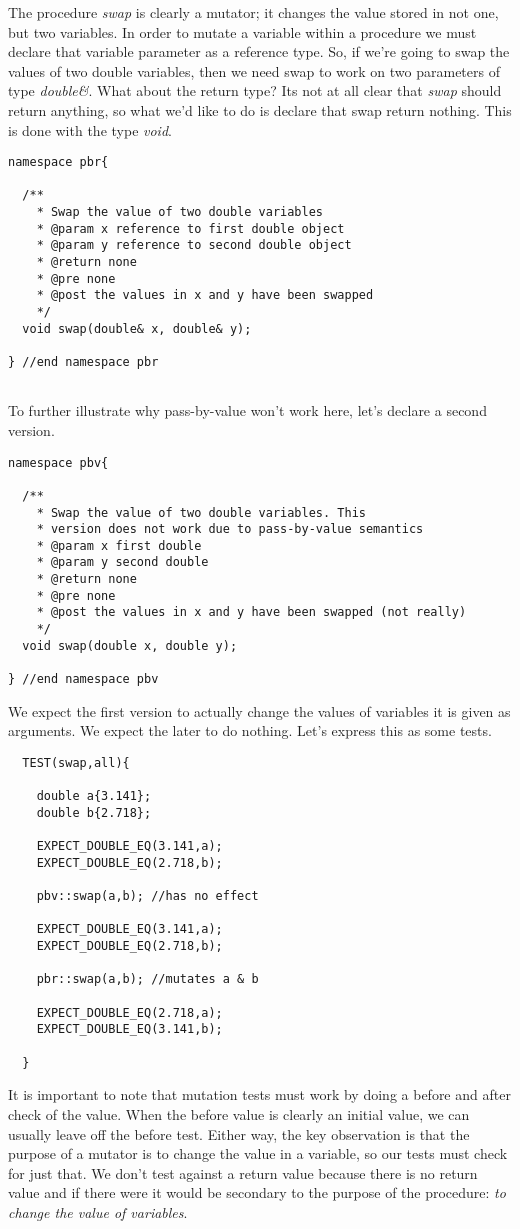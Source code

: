\documentclass[nobib]{tufte-handout}
\begin{document}
The procedure \textit{swap} is clearly a mutator; it changes the value stored in not one, but two variables. In order to mutate a variable within a procedure we must declare that variable parameter as a reference type. So, if we're going to swap the values of two double variables, then we need swap to work on two parameters of type \textit{double\&}. What about the return type? Its not at all clear that \textit{swap} should return anything, so what we'd like to do is declare that swap return nothing. This is done with the type \textit{void}.
\begin{verbatim}
namespace pbr{

  /**
    * Swap the value of two double variables
    * @param x reference to first double object
    * @param y reference to second double object 
    * @return none
    * @pre none
    * @post the values in x and y have been swapped
    */
  void swap(double& x, double& y);

} //end namespace pbr


\end{verbatim}
To further illustrate why pass-by-value won't work here, let's declare a second version.
\begin{verbatim}
namespace pbv{

  /**
    * Swap the value of two double variables. This
    * version does not work due to pass-by-value semantics
    * @param x first double
    * @param y second double
    * @return none
    * @pre none
    * @post the values in x and y have been swapped (not really)
    */
  void swap(double x, double y);

} //end namespace pbv
\end{verbatim}

We expect the first version to actually change the values of variables it is given as arguments. We expect the later to do nothing. Let's express this as some tests.
\begin{verbatim}
  TEST(swap,all){

    double a{3.141};
    double b{2.718};

    EXPECT_DOUBLE_EQ(3.141,a);
    EXPECT_DOUBLE_EQ(2.718,b);

    pbv::swap(a,b); //has no effect

    EXPECT_DOUBLE_EQ(3.141,a);
    EXPECT_DOUBLE_EQ(2.718,b);

    pbr::swap(a,b); //mutates a & b

    EXPECT_DOUBLE_EQ(2.718,a);
    EXPECT_DOUBLE_EQ(3.141,b);

  }
\end{verbatim}
It is important to note that mutation tests must work by doing a before and after check of the value.  When the before value is clearly an initial value, we can usually leave off the before test.  Either way, the key observation is that the purpose of a mutator is to change the value in a variable, so our tests must check for just that.  We don't test against a return value because there is no return value and if there were it would be secondary to the purpose of the procedure: \textit{to change the value of variables}.
\end{document}

